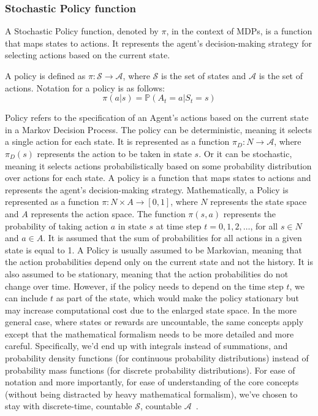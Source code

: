 \documentclass[../xlapes02]{subfiles}
\begin{document}
    \subsubsection{Stochastic Policy function}\label{subsubsec:policy}
    A Stochastic Policy function, denoted by $\pi$, in the context of MDPs, is a function that maps states to actions. It represents the agent's decision-making strategy for selecting actions based on the current state.
    \begin{definition}
        A policy is defined as $\pi: \mathcal{S} \rightarrow \mathcal{A}$, where $\mathcal{S}$ is the set of states and $\mathcal{A}$ is the set of actions. Notation for a policy is as follows:
        \begin{equation}
            \label{eq:policy}
            \pi(a|s)=\mathbb{P}(A_t=a|S_t=s)
        \end{equation}
    \end{definition}
    Policy refers to the specification of an Agent's actions based on the current state in a Markov Decision Process. The policy can be deterministic, meaning it selects a single action for each state. It is represented as a function $\pi_D : N \rightarrow \mathcal{A}$, where $\pi_D(s)$ represents the action to be taken in state $s$. Or it can be stochastic, meaning it selects actions probabilistically based on some probability distribution over actions for each state. A policy is a function that maps states to actions and represents the agent's decision-making strategy. Mathematically, a Policy is represented as a function $\pi : N \times A \rightarrow [0, 1]$, where $N$ represents the state space and $A$ represents the action space. The function $\pi(s, a)$ represents the probability of taking action $a$ in state $s$ at time step $t = 0, 1, 2, \ldots$, for all $s \in N$ and $a \in A$. It is assumed that the sum of probabilities for all actions in a given state is equal to 1. A Policy is usually assumed to be Markovian, meaning that the action probabilities depend only on the current state and not the history. It is also assumed to be stationary, meaning that the action probabilities do not change over time. However, if the policy needs to depend on the time step $t$, we can include $t$ as part of the state, which would make the policy stationary but may increase computational cost due to the enlarged state space. In the more general case, where states or rewards are uncountable, the same concepts apply except that the mathematical formalism needs to be more detailed and more careful. Specifically, we'd end up with integrals instead of summations, and probability density functions (for continuous probability distributions) instead of probability mass functions (for discrete probability distributions). For ease of notation and more importantly, for ease of understanding of the core concepts (without being distracted by heavy mathematical formalism), we've chosen to stay with discrete-time, countable $\mathcal{S}$, countable $\mathcal{A}$~\cite{rao2022foundations}.
\end{document}

